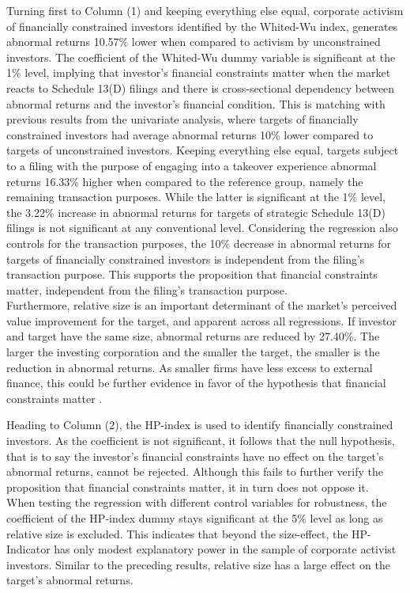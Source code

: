 \documentclass[12pt]{article}
\begin{document}
\begin{table}[!htbp]
\begin{adjustbox}{max width=\textwidth}
	\end{adjustbox}
\end{table}
Turning first to Column (1) and keeping everything else equal, corporate activism of financially constrained investors identified by the Whited-Wu index, generates abnormal returns 10.57\% lower when compared to activism by unconstrained investors. The coefficient of the Whited-Wu dummy variable is significant at the 1\% level, implying that investor's financial constraints matter when the market reacts to Schedule 13(D) filings and there is cross-sectional dependency between abnormal returns and the investor's financial condition. This is matching with previous results from the univariate analysis, where targets of financially constrained investors had average abnormal returns 10\% lower compared to targets of unconstrained investors. Keeping everything else equal, targets subject to a filing with the purpose of engaging into a takeover experience abnormal returns 16.33\% higher when compared to the reference group, namely the remaining transaction purposes. While the latter is significant at the 1\% level, the 3.22\% increase in abnormal returns for targets of strategic Schedule 13(D) filings is not significant at any conventional level. Considering the regression also controls for the transaction purposes, the 10\% decrease in abnormal returns for targets of financially constrained investors is independent from the filing's transaction purpose. This supports the proposition that financial constraints matter, independent from the filing's transaction purpose.\\
Furthermore, relative size is an important determinant of the market's perceived value improvement for the target, and apparent across all regressions. If investor and target have the same size, abnormal returns are reduced by 27.40\%. The larger the investing corporation and the smaller the target, the smaller is the reduction in abnormal returns. As smaller firms have less excess to external finance, this could be further evidence in favor of the hypothesis that financial constraints matter \citep[p.15]{heller2015}.

Heading to Column (2), the HP-index is used to identify financially constrained investors. As the coefficient is not significant, it follows that the null hypothesis, that is to say the investor's financial constraints have no effect on the target's abnormal returns, cannot be rejected. Although this fails to further verify the proposition that financial constraints matter, it in turn does not oppose it.\\
When testing the regression with different control variables for robustness, the coefficient of the HP-index dummy stays significant at the 5\% level as long as relative size is excluded. This indicates that beyond the size-effect, the HP-Indicator has only modest explanatory power in the sample of corporate activist investors. Similar to the preceding results, relative size has a large effect on the target's abnormal returns.
\end{document}
